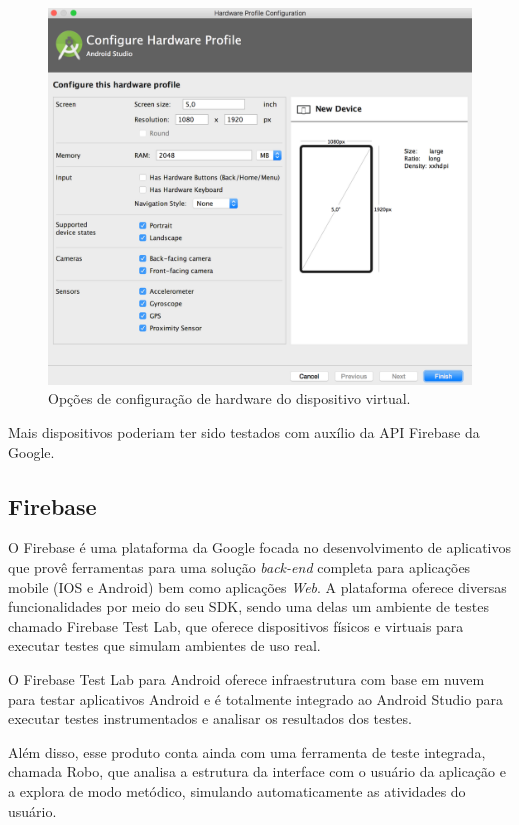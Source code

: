	\begin{figure}[!htb]
       \begin{center}  
          \includegraphics[width=0.8\columnwidth]{img/hw_dispositivo_virtual.png}
           \caption{\label{fig:hw_dispositivo_virtual}Opções de configuração de hardware do dispositivo virtual.}
       \end{center}
   \end{figure}
\clearpage   


Mais dispositivos poderiam ter sido testados com auxílio da API Firebase da Google. 

\subsection{Firebase}

O Firebase é uma plataforma da Google focada no desenvolvimento de aplicativos que provê ferramentas para uma solução \textit{back-end} completa para aplicações mobile (IOS e Android) bem como aplicações \textit{Web}. A plataforma oferece diversas funcionalidades por meio do seu SDK, sendo uma delas um ambiente de testes chamado Firebase Test Lab, que oferece dispositivos físicos e virtuais para executar testes que simulam ambientes de uso real. 

O Firebase Test Lab para Android oferece infraestrutura com base em nuvem para testar aplicativos Android e é totalmente integrado ao Android Studio para executar testes instrumentados e analisar os resultados dos testes. \cite{firebasetestlab}

Além disso, esse produto conta ainda com uma ferramenta de teste integrada, chamada Robo, que analisa a estrutura da interface com o usuário da aplicação e a explora de modo metódico, simulando automaticamente as atividades do usuário.

